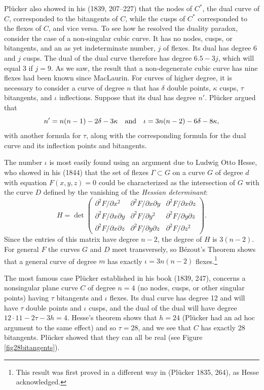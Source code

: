 Pl\"ucker also showed in his (1839, 207--227) that the nodes of $C^{*}$, the dual curve of $C$,  corresponded to the bitangents of $C$, while the cusps of $C^{*}$ corresponded to the flexes of $C$, and vice versa. To see how he resolved the duality paradox, consider  the case of a non-singular cubic curve. It has no nodes, cusps, or bitangents, and an as yet indeterminate number, $j$ of flexes. Its dual has degree 6 and $j$ cusps. The dual of the dual curve therefore has degree $6.5 - 3j$, which will equal 3 if $j = 9.$ As we saw, the result that a non-degenerate cubic curve has nine flexes had been known since MacLaurin. For curves of higher degree, it is necessary to consider a curve of degree $n$ that has $\delta$ double points, $\kappa$ cusps, $\tau$ bitangents, and $\iota$ inflections. Suppose that its dual has degree $n'$. Pl\"ucker argued that
$$
n' = n(n-1) - 2\delta - 3 \kappa
\quad
\hbox{and}\quad \iota = 3n(n-2) - 6\delta - 8\kappa,
$$
with another formula for $\tau$, along with the corresponding formula for the dual curve and its inflection points and bitangents.

The number $\iota$ is most easily found using an argument due to Ludwig Otto Hesse, who showed  in his (1844)  that the set of flexes $\Gamma\subset G$ on a curve $G$ of degree $d$ with equation $F(x, y, z) = 0$ could be characterized as the intersection of $G$  with the curve $D$ defined by the vanishing of the \emph{Hessian determinant}:
$$
H = \det \begin{pmatrix}
 \partial^{2}F/\partial x^{2} &\partial^{2}F/\partial x\partial y &\partial^{2}F/\partial x\partial z \\
\partial^{2}F/\partial x\partial y  &\partial^{2}F/\partial y^{2} &\partial^{2}F/\partial y\partial z \\
\partial^{2}F/\partial x\partial z &\partial^{2}F/\partial y\partial z &\partial^{2}F/\partial z^{2} 
\end{pmatrix}.
$$
Since the entries of this matrix have degree $n-2$, the degree of $H$ is $3(n-2).$ For general $F$ the curves $G$ and $D$ meet transversely, so B\'ezout's Theorem shows that a general curve of degree $m$ has exactly $\iota = 3n(n-2)$ flexes.\footnote{This result was first proved in a different way in (Pl\"ucker 1835, 264), as Hesse acknowledged.}

The most famous case Pl\"ucker established in  his book (1839, 247),  concerns   a nonsingular plane curve $C$ of degree $n=4$  (no nodes, cusps, or other singular points) having $\tau$ bitangents and $\iota$ flexes.   Its dual curve has degree 12 and will have $\tau$ double points and $\iota$ cusps, and the dual of the dual will have degree 
$12\cdot 11 - 2\tau - 3h  = 4.$ 
Hesse's theorem shows that $h = 24$ (Pl\"ucker  had an ad hoc argument to the same effect)  and so $\tau = 28$,  and we  see that $C$ has exactly 28 bitangents. Pl\"ucker showed that they can all be real (see Figure \ref{fig28bitangents}).

